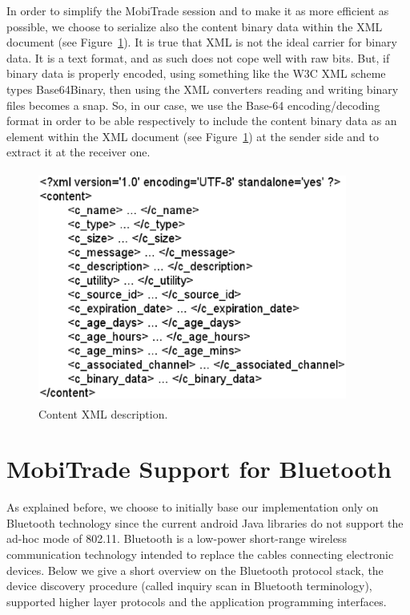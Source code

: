 In order to simplify the MobiTrade session and to make it as more efficient as possible, we choose to serialize also the content binary data within the XML document (see Figure~\ref{contentxml}). It is true that XML is not the ideal carrier for binary data. It is a text format, and as such does not cope well with raw bits. But, if binary data is properly encoded, using something like the W3C XML scheme types Base64Binary, then using the XML converters reading and writing binary files becomes a snap. So, in our case, we use the Base-64 encoding/decoding format in order to be able respectively to include the content binary data as an element within the XML document (see Figure~\ref{contentxml}) at the sender side and to extract it at the receiver one.  

\begin{figure}[!h]
\begin{center}
\includegraphics[width=4in,height=3in]{Chapitre6/contentxml.eps}
\end{center}
\caption{Content XML description.}
\label{contentxml}
\end{figure}

\section{MobiTrade Support for Bluetooth}
\label{MobiTradeDesignAndImplementation}

As explained before, we choose to initially base our implementation only on Bluetooth technology since the current android Java libraries do not support the ad-hoc mode of 802.11. Bluetooth is a low-power short-range wireless communication technology intended to replace the cables connecting electronic devices. Below we give a short overview on the Bluetooth protocol stack, the device discovery procedure (called inquiry scan in Bluetooth terminology), supported higher layer protocols and the application programming interfaces.

